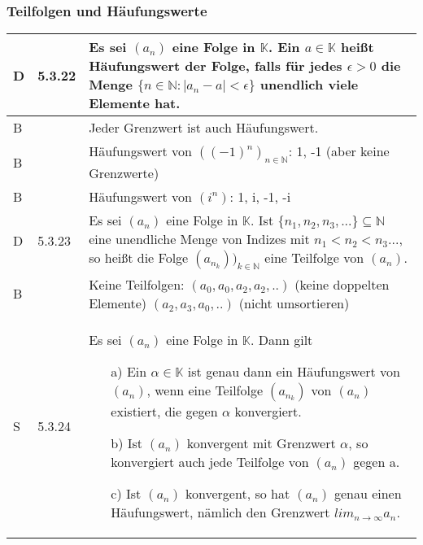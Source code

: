 \pagebreak

\subsubsection{Teilfolgen und Häufungswerte}
      
    \begin{longtable}{p{0.75cm} p{1cm} p{16cm}}
        \toprule
        
        D   & 5.3.22&   Es sei $(a_n)$ eine Folge in $\mathbb{K}$. Ein $a \in \mathbb{K}$ heißt Häufungswert der Folge, falls für jedes
                        $\epsilon > 0$ die Menge $\{n \in \mathbb{N}: |a_n -a| < \epsilon\}$ unendlich viele Elemente hat. \\
        \midrule
        B   &       &   Jeder Grenzwert ist auch Häufungswert. \\
        \midrule
        B   &       &   Häufungswert von $((-1)^n)_{n \in \mathbb{N}}$: 1, -1 (aber keine Grenzwerte) \\
        \midrule
        B   &       &   Häufungswert von $(i^n)$: 1, i, -1, -i \\
        \midrule
        D   & 5.3.23&   Es sei $(a_n)$ eine Folge in $\mathbb{K}$. Ist $\{n_1,n_2,n_3,...\} \subseteq \mathbb{N}$ eine unendliche Menge 
                        von Indizes mit $n_1 < n_2 < n_3 ...$, so heißt die Folge $(a_{n_k}))_{k \in \mathbb{N}}$ eine Teilfolge von $(a_n)$. \\
        \midrule
        B   &       &   Keine Teilfolgen: \hfill \break
                        $(a_0, a_0, a_2, a_2,..)$ (keine doppelten Elemente) \hfill \break
                        $(a_2, a_3, a_0,..)$ (nicht umsortieren) \\
        \midrule
        S   & 5.3.24&   Es sei $(a_n)$ eine Folge in $\mathbb{K}$. Dann gilt
                            \begin{itemize}[topsep=-0.5cm]
                                \item[a)] Ein $\alpha \in \mathbb{K}$ ist genau dann ein Häufungswert von $(a_n)$, wenn eine Teilfolge $(a_{n_k})$ von
                                            $(a_n)$ existiert, die gegen $\alpha$ konvergiert.
                                \item[b)] Ist $(a_n)$ konvergent mit Grenzwert $\alpha$, so konvergiert auch jede Teilfolge von $(a_n)$ gegen a.
                                \item[c)] Ist $(a_n)$ konvergent, so hat $(a_n)$ genau einen Häufungswert, nämlich den Grenzwert 
                                            $lim_{n \rightarrow \infty} a_n$.
                            \end{itemize} \vspace{-0cm} \\
        \bottomrule
        
    \end{longtable}    

